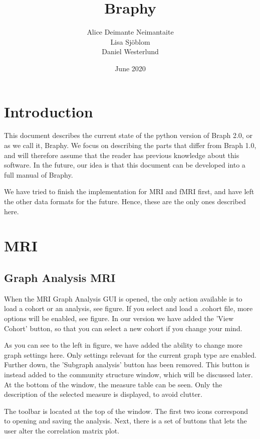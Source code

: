 \documentclass{article}
\title{Braphy}
\author{Alice Deimante Neimantaite \\ Lisa Sjöblom \\ Daniel Westerlund}
\date{June 2020}
\begin{document}
\maketitle

\clearpage

\section{Introduction}

This document describes the current state of the python version of Braph 2.0, or as we call it, Braphy. We focus on describing the parts that differ from Braph 1.0, and will therefore assume that the reader has previous knowledge about this software. In the future, our idea is that this document can be developed into a full manual of Braphy.

We have tried to finish the implementation for MRI and fMRI first, and have left the other data formats for the future. Hence, these are the only ones described here.


\section{MRI}

\subsection{Graph Analysis MRI}

When the MRI Graph Analysis GUI is opened, the only action available is to load a cohort or an analysis, see figure. If you select and load a .cohort file, more options will be enabled, see figure. In our version we have added the 'View Cohort' button, so that you can select a new cohort if you change your mind.

As you can see to the left in figure, we have added the ability to change more graph settings here. Only settings relevant for the current graph type are enabled. Further down, the 'Subgraph analysis' button has been removed. This button is instead added to the community structure window, which will be discussed later. At the bottom of the window, the measure table can be seen. Only the description of the selected measure is displayed, to avoid clutter. 

The toolbar is located at the top of the window. The first two icons correspond to opening and saving the analysis. Next, there is a set of buttons that lets the user alter the correlation matrix plot.
\end{document}
